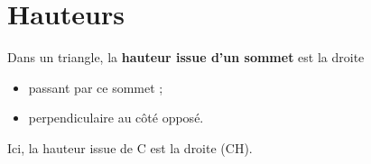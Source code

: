 \documentclass[../€Cours-complet/Cours-complet]{subfiles}
\begin{document}
\section{Hauteurs}

\begin{cours}
	Dans un triangle, la \textbf{hauteur issue d'un sommet} est la droite
	\begin{itemize}
		\item passant par ce sommet ;
		\item perpendiculaire au côté opposé.
	\end{itemize}
\end{cours}

\begin{exemple}
	\begin{minipage}{0.58\linewidth}
	\end{minipage}
	\hspace{1em}
	\begin{minipage}{0.35\linewidth}
		Ici, la hauteur issue de C est la droite (CH).
	\end{minipage}
\end{exemple}
\end{document}
